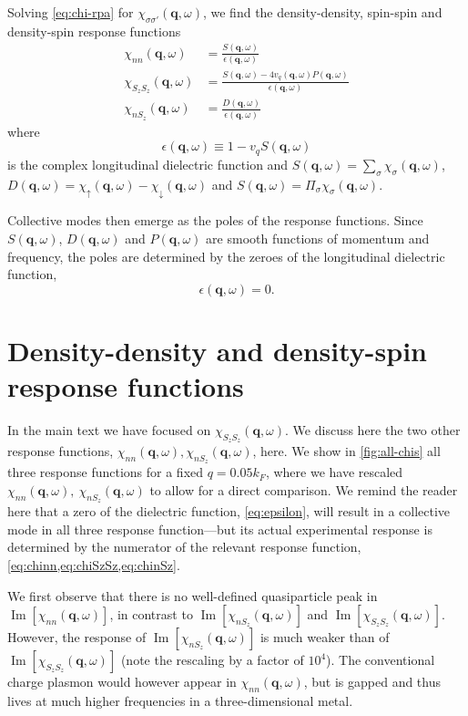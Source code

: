 \documentclass[aps,prb,reprint,twocolumns,superscriptaddress,nofootinbib]{revtex4-2}
\DeclareMathOperator{\Imm}{Im}
\newcommand{\kF}{k_{F}}
\begin{document}
	
		Solving \cref{eq:chi-rpa} for $\chi_{\sigma\sigma'}(\bm q,\omega)$, we find the density-density, spin-spin and density-spin response functions
	\begin{align}
		\chi_{nn}(\bm q,\omega) &= \frac{S(\bm q,\omega)}{\epsilon(\bm q,\omega)} \label{eq:chinn}\\
		\chi_{S_zS_z}(\bm q,\omega)&=\frac{S(\bm q,\omega)-4v_q(\bm q,\omega)P(\bm q,\omega)}{\epsilon(\bm q,\omega)} \label{eq:chiSzSz}\\
		\chi_{nS_z}(\bm q,\omega)&=\frac{D(\bm q,\omega)}{\epsilon(\bm q,\omega)} \label{eq:chinSz}
	\end{align}
	where 
	\begin{equation}
		\epsilon(\bm q,\omega) \equiv 1 - v_qS(\bm q,\omega) \label{eq:epsilon}
	\end{equation}
	is the complex longitudinal dielectric function and $S(\bm q,\omega)=\sum_\sigma \chi_\sigma (\bm q,\omega)$, $D(\bm q,\omega)=\chi_\uparrow (\bm q,\omega)-\chi_\downarrow (\bm q,\omega)$ and $S(\bm q,\omega)=\Pi_\sigma \chi_\sigma (\bm q,\omega)$. 
	
	Collective modes then emerge as the poles of the response functions. Since $S(\bm q,\omega)$, $D(\bm q,\omega)$ and $P(\bm q,\omega)$ are smooth functions of momentum and frequency, the poles are determined by the zeroes of the longitudinal dielectric function, 
	\begin{equation}
		\epsilon(\bm q,\omega) = 0. \label{eq:poles}
	\end{equation}
	\section{Density-density and density-spin response functions} 
	In the main text we have focused on $\chi_{S_zS_z}(\bm q,\omega)$. We discuss here the two other response functions, $\chi_{nn}(\bm q,\omega), \chi_{nS_z}(\bm q,\omega)$, here.	
	We show in \cref{fig:all-chis} all three response functions for a fixed $q=0.05\kF$, where we have rescaled $\chi_{nn}(\bm q,\omega),\ \chi_{nS_z}(\bm q,\omega)$ to allow for a direct comparison. We remind the reader here that a zero of the dielectric function, \cref{eq:epsilon}, will result in a collective mode in all three response function---but its actual experimental response is determined by the numerator of the relevant response function, \cref{eq:chinn,eq:chiSzSz,eq:chinSz}. 
	
	We first observe that there is no well-defined quasiparticle peak in $\Imm[\chi_{nn}(\bm q,\omega)]$, in contrast to $\Imm[\chi_{nS_z}(\bm q,\omega)]$ and $\Imm[\chi_{S_zS_z}(\bm q,\omega)]$. However, the response of $\Imm[\chi_{nS_z}(\bm q,\omega)]$ is much weaker than of $\Imm[\chi_{S_zS_z}(\bm q,\omega)]$ (note the rescaling by a factor of $10^4$). 	
	The conventional charge plasmon would however appear in $\chi_{nn}(\bm q,\omega)$, but is gapped and thus lives at much higher frequencies in a three-dimensional metal.
	
\end{document}
